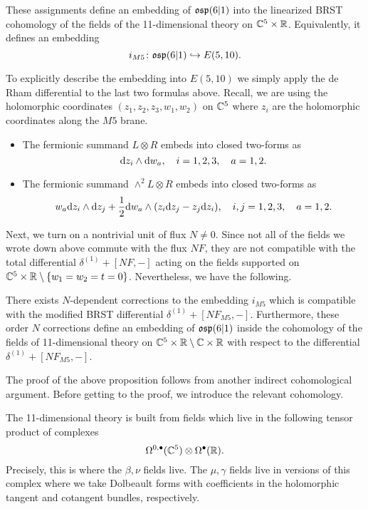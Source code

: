 \begin{lem}
These assignments define an embedding of $\mathfrak{osp}(6|1)$ into the linearized BRST cohomology of the fields of the 11-dimensional theory on $\mathbb C^5 \times \mathbb R$. 
Equivalently, it defines an embedding
\[
i_{M5} \colon \mathfrak{osp}(6|1) \hookrightarrow E(5,10) .
\]
\end{lem} 

To explicitly describe the embedding into $E(5,10)$ we simply apply the de Rham differential to the last two formulas above.
Recall, we are using the holomorphic coordinates $(z_1,z_2,z_3, w_1,w_2)$ on $\mathbb C^5$ where $z_i$ are the holomorphic coordinates along the $M5$ brane. 
\begin{itemize}
\item 
The fermionic summand $L \otimes R$ embeds into closed two-forms as
\[
{\rm d} z_i \wedge {\rm d} w_a, \quad i=1,2,3, \quad a=1,2. 
\] 
\item 
The fermionic summand $\wedge^2 L \otimes R$ embeds into closed two-forms as
\[
w_a {\rm d} z_i  \wedge {\rm d} z_j + \frac12 {\rm d} w_a \wedge (z_i {\rm d} z_j - z_j {\rm d} z_i) , \quad i,j=1,2,3, \quad a=1,2. 
\] 
\end{itemize}

\parsec[]

Next, we turn on a nontrivial unit of flux $N \ne 0$. 
Since not all of the fields we wrote down above commute with the flux $N F$, they are not compatible with the total differential $\delta^{(1)} + [N F, -]$ acting on the fields supported on $\mathbb C^5 \times \mathbb R \setminus \{w_1=w_2=t=0\}$. 
Nevertheless, we have the following.

\begin{prop}
\label{prop:brads7}
There exists $N$-dependent corrections to the embedding $i_{M5}$ which is compatible with the modified BRST differential $\delta^{(1)} + [N F_{M5},-]$. 
Furthermore, these order $N$ corrections define an embedding of $\mathfrak{osp}(6|1)$ inside the cohomology of the fields of 11-dimensional theory on $\mathbb C^5 \times \mathbb R \setminus \mathbb C \times \mathbb R$ with respect to the differential $\delta^{(1)} + [N  F_{M5},-]$.
\end{prop}

\parsec[s:thfcohomology]

The proof of the above proposition follows from another indirect cohomological argument. 
Before getting to the proof, we introduce the relevant cohomology. 

The 11-dimensional theory is built from fields which live in the following tensor product of complexes 
\[
\Omega^{0,\bullet}(\mathbb C^5) \otimes \Omega^\bullet(\mathbb R).
\]
Precisely, this is where the $\beta,\nu$ fields live. 
The $\mu,\gamma$ fields live in versions of this complex where we take Dolbeault forms with coefficients in the holomorphic tangent and cotangent bundles, respectively. 

